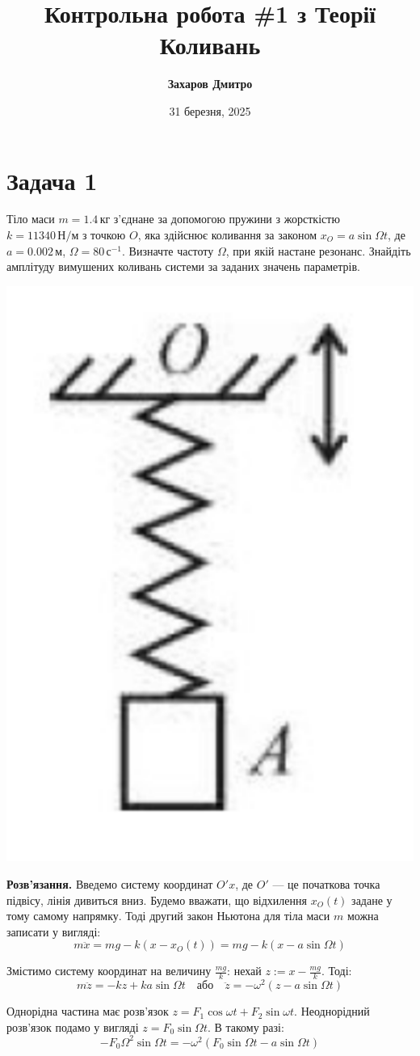 \documentclass{hw_template}
\title{\bfseries Контрольна робота \#1 з Теорії Коливань}
\author{\bfseries Захаров Дмитро}
\date{31 березня, 2025}
\begin{document}
\pagestyle{fancy}

\maketitle

\section{Задача 1}


\begin{problem}
    Тіло маси $m=1.4 \, \text{кг}$ з'єднане за допомогою пружини з жорсткістю
    $k=11340 \, \text{Н}/\text{м}$ з точкою $O$, яка здійснює коливання
    за законом $x_O=a \sin \Omega t$, де $a=0.002 \, \text{м}$, $\Omega=80 \,
    \text{с}^{-1}$. Визначте частоту $\Omega$, при якій настане резонанс.
    Знайдіть амплітуду вимушених коливань системи за заданих значень параметрів.
\end{problem}

\begin{center}
    \includegraphics[width=0.2\linewidth]{images/test_1.png}
\end{center}

\textbf{Розв'язання.} Введемо систему координат $O'x$, де $O'$ --- це початкова
точка підвісу, лінія дивиться вниз. Будемо вважати, що відхилення $x_O(t)$
задане у тому самому напрямку. Тоді другий закон Ньютона для тіла маси $m$ можна
записати у вигляді:
\begin{equation*}
    m\ddot{x} = mg - k(x-x_O(t)) = mg - k(x-a\sin\Omega t)
\end{equation*}

Змістимо систему координат на величину $\frac{mg}{k}$: нехай $z := x -
\frac{mg}{k}$. Тоді:
\begin{equation*}
    m\ddot{z} = -kz + ka \sin \Omega t \quad \text{або} \quad \ddot{z} = -\omega^2(z - a \sin \Omega t)
\end{equation*}

Однорідна частина має розв'язок $z=F_1 \cos \omega t + F_2 \sin \omega t$. Неоднорідний 
розв'язок подамо у вигляді $z = F_0 \sin \Omega t$. В такому разі:
\begin{equation*}
    -F_0\Omega^2 \sin \Omega t = -\omega^2(F_0 \sin \Omega t - a \sin \Omega t)
\end{equation*}
\end{document}
